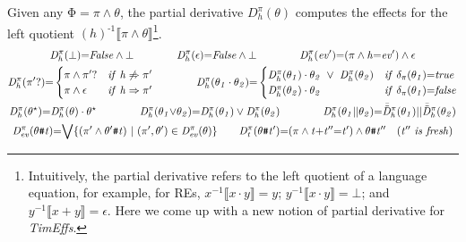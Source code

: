 \documentclass[acmsmall,10pt,review]{acmart}
\newcommand{\env}{\code{\mathcal{V}}}
\newcommand{\es}{\theta}
\newcommand{\ev}{ev}
\newcommand{\timedEffects}{\emph{TimEffs}}
\newcommand{\effect}{{\ensuremath{\mathrm{\Phi}}}}
\newcommand{\code}[1]{{\tt{\ensuremath{\m{#1}}}}}
\newcommand{\m}{\mathit}
\newcommand{\mysharp}{{\mathrel{\texttt{\#}}}}
\begin{document}
{\begin{definition}\label{Derivative}
  Given any \code{\effect {=}\pi \wedge  \es}, 
  the partial derivative \code{D^{\pi}_{h}( \es)} 
   computes the  effects for the 
  left quotient \code{(h)^{\text{-}1}\llbracket \pi \wedge \es 
  \rrbracket}\footnote{Intuitively, the partial derivative refers to the left quotient of a language equation, for example, for REs, \code{x^{{-}1} \llbracket x\cdot y\rrbracket {=} y};  \code{y^{{-}1} \llbracket x\cdot y\rrbracket {=} \bot }; and  \code{y^{{-}1} \llbracket x + y\rrbracket {=} \epsilon}. Here we come up with a new notion of partial derivative for \timedEffects. 
  }. 
  \begin{gather*}
  \code{D^{\pi}_{h}( \bot ) {=}}  \code{False \wedge \bot } 
  \qquad\qquad 
  \code{D^{\pi}_{h}(   \epsilon) {=}}  \code{False \wedge \bot } 
  \qquad\qquad
  \code{D^{\pi}_{h}(  \ev^\prime) } {=} 
  \code{  (\pi \wedge h{=}\ev^\prime) \wedge \epsilon} 
  \\
  {
   \code{\code{D^{\pi}_{h}( \pi^\prime?)} {=}}
  \begin{cases}
        \code{\pi \wedge \pi^\prime? } &\code{if\ h \not\Rightarrow  \pi^\prime}   \\
        \code{\pi \wedge \epsilon} & \code{if\ h \Rightarrow \pi^\prime} 
      \end{cases} 
      }
      \qquad \quad \ \ \ 
  {
   \code{D^{\pi}_{h}( \es_1  \cdot  \es_2) {=} }
  \begin{cases}
        \code{D^{\pi}_{h}( \es_1) \cdot  \es_2\ \vee \  D^{\pi}_{h}( \es_2)}  &\code{if\ \delta_{\pi}(\es_1) {=} true}   \\
        \code{D^{\pi}_{h}( \es_2) \cdot  \es_2} & \code{if\ \delta_{\pi}(\es_1) {=} false} 
      \end{cases} 
      }
  \\
  \code{D^{\pi}_{h}(  {\es^\star}) } {=} \code{ D^{\pi}_{h}(  {\es}) \cdot {\es^\star}}  
  \qquad\quad \ \ \ 
  \code{D^{\pi}_{h}(  \es_1 {\vee} \es_2) } {=} \code{ D^{\pi}_{h}(  \es_1) \vee D^{\pi}_{h}(  \es_2)} 
  \qquad \quad\ \ \ 
  \code{D^{\pi}_{h}( \es_1 {||}\es_2)} {=} \code{\Bar{\Bar{D}}^{\pi}_{h}( \es_1)} || \code{\Bar{\Bar{D}}^{\pi}_{h}( \es_2)} 
   \\
   \code{D^{\pi}_{\ev}(  \es \mysharp t) } {=} {\bigvee}
   \code{ \{ (\pi^\prime \wedge \es^\prime  \mysharp t) \ | \ (\pi^\prime, \es^\prime) \in D^{\pi}_{\ev}(\es) \} } 
\qquad 
   \code{D^{\pi}_{t}(  \es \mysharp t^\prime) } {=} 
   \code{ (\pi \wedge t{+}t^{\prime\prime}{=}t^\prime) \wedge  
   \es \mysharp t^{\prime\prime} \ \ \  {(t^{\prime\prime}\ is\ fresh)} } 
  \end{gather*}
  \end{definition}
  
}
\end{document}
